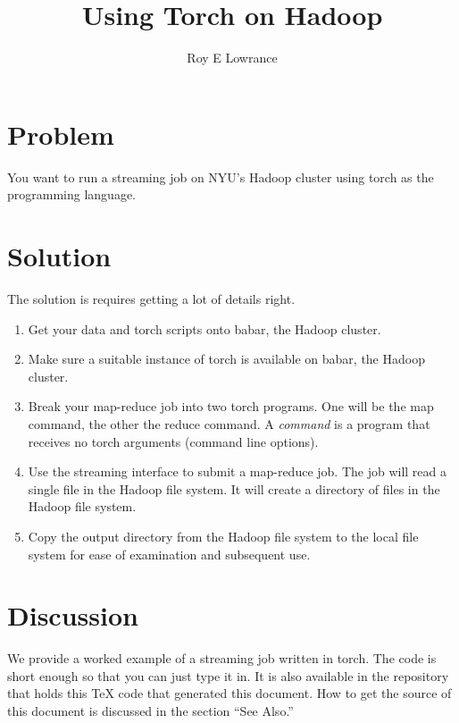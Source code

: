 \documentclass{article}
\begin{document}
\title{Using Torch on Hadoop}
\author{Roy E Lowrance}
\maketitle


\section{Problem}

You want to run a streaming job on NYU's Hadoop cluster using torch as
the programming language.

\section{Solution}

The solution is requires getting a lot of details right.

\begin{enumerate}
  \item Get your data and torch scripts onto babar, the Hadoop cluster.
  \item Make sure a suitable instance of torch is available on babar,
    the Hadoop cluster.
  \item Break your map-reduce job into two torch programs. One will be
    the map command, the other the reduce command. A \emph{command} is a
    program that receives no torch arguments (command line
    options). 
  \item Use the streaming interface to submit a map-reduce job. The job
    will read a single file in the Hadoop file system. It will create a
    directory of files in the Hadoop file system.
  \item Copy the output directory from the Hadoop file system to the
    local file system for ease of examination and subsequent use.
\end{enumerate}

\section{Discussion}

We provide a worked example of a streaming job written in torch. The
code is short enough so that you can just type it in. It is also
available in the repository that holds this TeX code that generated this
document. How to get the source of this document is discussed in the
section ``See Also.''
\end{document}
